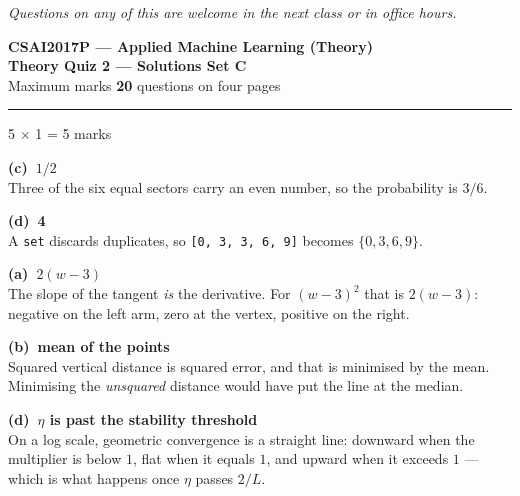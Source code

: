 \documentclass[10pt,a4paper]{article}
\newcommand{\SetLetter}{}
\newcommand{\parthead}[2]{\vspace{2pt}\noindent\rule{\linewidth}{0.4pt}\par\vspace{2pt}%
  \noindent{\bfseries Part #1}\hfill{\small #2}\par\vspace{1pt}}
\newcommand{\sol}[1]{\textbf{#1}}
\begin{document}
\vfill

{\footnotesize\itshape Questions on any of this are welcome in the next class or in office hours.}

\newpage


\renewcommand{\SetLetter}{C}\setcounter{page}{1}

\begin{center}
{\large\bfseries CSAI2017P --- Applied Machine Learning (Theory)}\\[2pt]
{\large\bfseries Theory Quiz 2 --- Solutions \quad\textbullet\quad Set C}\\[3pt]
{\small Maximum marks \textbf{20} \quad\textbullet{} questions on four pages}
\end{center}
\vspace{2pt}

\noindent{}
\vspace{3pt}


\parthead{A --- Multiple choice}{5 $\times$ 1 = 5 marks}

\begin{sA}

  \item \sol{(c)\ $1/2$}\\ Three of the six equal sectors carry an even number, so the probability is $3/6$.

  \item \sol{(d)\ 4}\\ A \texttt{set} discards duplicates, so \texttt{[0, 3, 3, 6, 9]} becomes $\{0, 3, 6, 9\}$.

  \item \sol{(a)\ $2(w-3)$}\\ The slope of the tangent \emph{is} the derivative. For $(w-3)^2$ that is $2(w-3)$: negative on the left arm, zero at the vertex, positive on the right.

  \item \sol{(b)\ mean of the points}\\ Squared vertical distance is squared error, and that is minimised by the mean. Minimising the \emph{unsquared} distance would have put the line at the median.

  \item \sol{(d)\ $\eta$ is past the stability threshold}\\ On a log scale, geometric convergence is a straight line: downward when the multiplier is below $1$, flat when it equals $1$, and upward when it exceeds $1$ --- which is what happens once $\eta$ passes $2/L$.

\end{sA}
\end{document}
